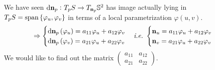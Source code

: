 We have seen \(\dd{\vb{n}}_p\colon T_p S\to T_{\vb{n}_p}\mathbb{S}^2\)
has image actually lying in \(T_p S=\operatorname{span}\left\{\varphi_u,
\varphi_v\right\}\) in terms of a local parametrization \(\varphi(u,v)\).
\[
    \Rightarrow \begin{cases}
        \dd\vb{n}_p\left(\varphi_u\right)=a_{11}\varphi_u+a_{12}\varphi_v\\
        \dd\vb{n}_p\left(\varphi_v\right)=a_{21}\varphi_u+a_{22}\varphi_v
    \end{cases}
    \emph{i.e.}\ \begin{cases}
        \vb{n}_u=a_{11}\varphi_u+a_{12}\varphi_v\\
        \vb{n}_v=a_{21}\varphi_u+a_{22}\varphi_v
    \end{cases}
\]
We would like to find out the matrix \(\begin{pmatrix}
    a_{11}&a_{12}\\
    a_{21}&a_{22}
\end{pmatrix}\).

